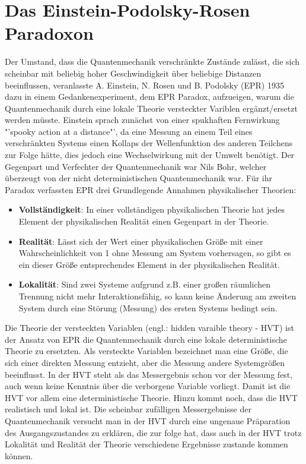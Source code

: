 \documentclass[twoside,colorback,accentcolor=tud4c,11pt]{tudreport}
\begin{document}
\section{Das Einstein-Podolsky-Rosen Paradoxon}
Der Umstand, dass die Quantenmechanik verschränkte Zustände zulässt, die sich scheinbar mit beliebig hoher Geschwindigkeit über beliebige Distanzen beeinflussen, veranlasste A. Einstein, N. Rosen und B. Podolsky (EPR) 1935 dazu in einem Gedankenexperiment, dem EPR Paradox, aufzueigen, warum die Quantenmechanik durch eine lokale Theorie versteckter Variblen ergänzt/ersetzt werden müsste. Einstein sprach zunächst von einer spukhaften Fernwirkung "'spooky action at a distance"', da eine Messung an einem Teil eines verschränkten Systems einen Kollaps der Wellenfunktion des anderen Teilchens zur Folge hätte, dies jedoch eine Wechselwirkung mit der Umwelt benötigt.
Der Gegenpart und Verfechter der Quantenmechanik war Nils Bohr, welcher überzeugt von der nicht deterministischen Quantenmechanik war.
Für ihr Paradox verfassten EPR drei Grundlegende Annahmen physikalischer Theorien:
\begin{itemize}
\item\textbf{Vollständigkeit}: In einer vollständigen physikalischen Theorie hat jedes Element der physikalischen Realität einen Gegenpart in der Theorie.
\item\textbf{Realität}: Lässt sich der Wert einer physikalischen Größe mit einer Wahrscheinlichkeit von 1 ohne Messung am System vorhersagen, so gibt es ein dieser Größe entsprechendes Element in der physikalischen Realität.
\item\textbf{Lokalität}: Sind zwei Systeme aufgrund z.B. einer großen räumlichen Trennung nicht mehr Interaktionsfähig, so kann keine Änderung am zweiten System durch eine Störung (Messung) des ersten Systems bedingt sein.
\end{itemize}
Die Theorie der versteckten Variablen (engl.: hidden varaible theory - HVT) ist der Ansatz von EPR die Quantenmechanik durch eine lokale deterministische Theorie zu ersetzten. Als versteckte Variablen bezeichnet man eine Größe, die sich einer direkten Messung entzieht, aber die Messung andere Systemgrößen beeinflusst. In der HVT steht als das Messergebnis schon vor der Messung fest, auch wenn keine Kenntnis über die verborgene Variable vorliegt. Damit ist die HVT vor allem eine deterministische Theorie. Hinzu kommt noch, dass die HVT realistisch und lokal ist. Die scheinbar zufälligen Messergebnisse der Quantenmechanik versucht man in der HVT durch eine ungenaue Präparation des Ausgangszustandes zu erklären, die zur folge hat, dass auch in der HVT trotz Lokalität und Realität der Theorie verschiedene Ergebnisse zustande kommen können.
\end{document}
